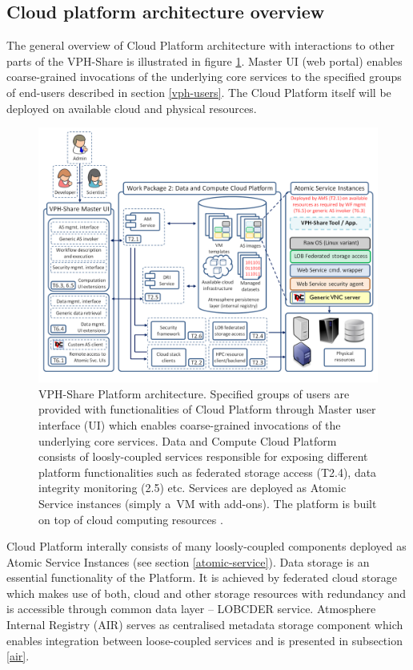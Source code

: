 \subsection{Cloud platform architecture overview}

The general overview of Cloud Platform architecture with interactions to other parts of
the VPH-Share is illustrated in figure \ref{fig:vph-architecture}. Master UI (web portal) enables
coarse-grained invocations of the underlying core services to the specified groups of
end-users described in section \ref{vph-users}. The Cloud Platform itself will be deployed on
available cloud and physical resources.

\begin{figure}[h!]
	\centering
	\includegraphics[width=\textwidth]{images/vph-architecture.png}
	\caption{VPH-Share Platform architecture. Specified groups of users are provided with
	functionalities of Cloud Platform through Master user interface (UI) which enables
	coarse-grained invocations of the underlying core services. Data and Compute Cloud
	Platform consists of loosly-coupled services responsible for exposing different platform
	functionalities such as federated storage access (T2.4), data integrity monitoring
	(2.5) etc. Services are deployed as Atomic Service instances (simply a~VM with add-ons).
	The platform is built on top of cloud computing resources \cite{vph-deliverable-2-2}.}
	\label{fig:vph-architecture}
\end{figure}

Cloud Platform interally consists of many loosly-coupled components deployed as Atomic Service
Instances (see section \ref{atomic-service}). Data storage is an essential functionality of
the Platform. It is achieved by
federated cloud storage which makes use of both, cloud and other storage
resources with redundancy and is accessible through common data layer --
LOBCDER service. Atmosphere Internal Registry (AIR) serves as
centralised metadata storage component which enables integration between 
loose-coupled services and is presented in subsection \ref{air}.

